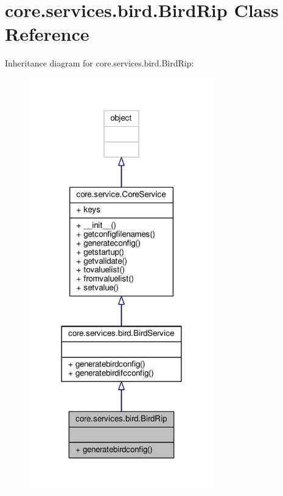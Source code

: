 \hypertarget{classcore_1_1services_1_1bird_1_1_bird_rip}{\section{core.\+services.\+bird.\+Bird\+Rip Class Reference}
\label{classcore_1_1services_1_1bird_1_1_bird_rip}
}


Inheritance diagram for core.\+services.\+bird.\+Bird\+Rip\+:
\nopagebreak
\begin{figure}[H]
\begin{center}
\leavevmode
\includegraphics[width=227pt]{classcore_1_1services_1_1bird_1_1_bird_rip__inherit__graph}
\end{center}
\end{figure}


